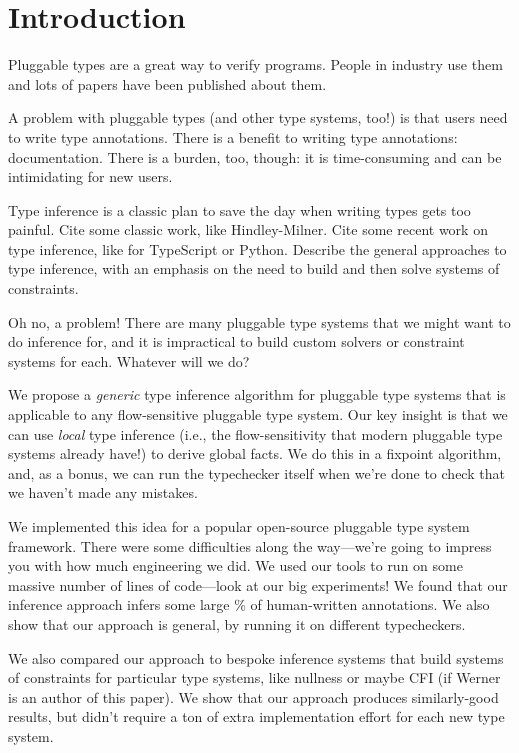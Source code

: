 \section{Introduction}
\label{sec:intro}


Pluggable types are a great way to verify programs. People in industry
use them and lots of papers have been published about them.

A problem with pluggable types (and other type systems, too!) is that
users need to write type annotations. There is a benefit to writing
type annotations: documentation. There is a burden, too, though: it
is time-consuming and can be intimidating for new users.

Type inference is a classic plan to save the day when writing types gets
too painful. Cite some classic work, like Hindley-Milner. Cite some recent
work on type inference, like for TypeScript or Python. Describe the general
approaches to type inference, with an emphasis on the need to build and then
solve systems of constraints.

Oh no, a problem! There are many pluggable type systems that we might want
to do inference for, and it is impractical to build custom solvers or
constraint systems for each. Whatever will we do?

We propose a \emph{generic} type inference algorithm for pluggable type
systems that is applicable to any flow-sensitive pluggable type system.
Our key insight is that we can use \emph{local} type inference (i.e.,
the flow-sensitivity that modern pluggable type systems already have!)
to derive global facts. We do this in a fixpoint algorithm, and, as a bonus,
we can run the typechecker itself when we're done to check that we haven't
made any mistakes.

We implemented this idea for a popular open-source pluggable type system
framework. There were some difficulties along the way---we're going to
impress you with how much engineering we did. We used our tools to run
on some massive number of lines of code---look at our big experiments!
We found that our inference approach infers some large \% of human-written
annotations. We also show that our approach is general, by running it
on  different typecheckers.

We also compared our approach to bespoke inference systems that build
systems of constraints for particular type systems, like nullness or
maybe CFI (if Werner is an author of this paper). We show that our approach
produces similarly-good results, but didn't require a ton of extra
implementation effort for each new type system.

